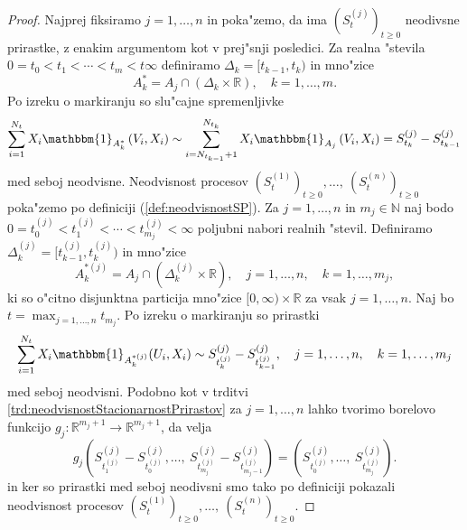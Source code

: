 \documentclass[12pt, a4paper, reqno]{amsart}
\theoremstyle{definition}
\theoremstyle{plain}
\newcommand{\R}{\mathbb{R}}
\newcommand{\N}{\mathbb{N}}
\newcommand{\1}{\mathds{1}}
\begin{document}
        \begin{proof}
            Najprej fiksiramo $j=1, \dots, n$ in poka"zemo, da ima $(S_t^{(j)})_{t\geq0}$   neodivsne prirastke, z 
            enakim argumentom kot v prej"snji posledici. 
            Za realna "stevila $0 = t_0 < t_1 < \cdots < t_m < t \infty$ definiramo $\Delta_k = [t_{k-1}, t_k)$ in 
            mno"zice 
            \begin{equation*}
                A_k^* = A_j \cap \left(\Delta_k \times \R\right), \quad k = 1, \dots, m.
            \end{equation*}
            Po izreku o markiranju so slu"cajne spremenljivke 
            \begin{equation*}
                \sum_{i = 1}^{N_{t}}X_i\mathbbm{1}_{A_k^*}\left(V_i, X_i\right) \sim \sum_{i = N_{t_{k-1}}+1}^{N_{t_k}}X_i\mathbbm{1}_{A_j}\left(V_i, X_i\right) = S_{t_k}^{(j)} - S_{t_{k-1}}^{(j)}
            \end{equation*}
            med seboj neodvisne.
            Neodvisnost procesov $(S_t^{(1)})_{t\geq0}, \dots, \ (S_t^{(n)})_{t\geq0}$ poka"zemo po definiciji
            (\ref{def:neodvisnostSP}). Za $j=1, \dots, n$ in $m_j\in\N$ naj bodo $0 = t_0^{(j)} < t_1^{(j)} < \cdots < t^{(j)}_{m_j} < \infty$ 
            poljubni nabori realnih "stevil. Definiramo $\Delta^{(j)}_k = [t^{(j)}_{k-1}, t^{(j)}_k)$ in mno"zice
            \begin{equation*}
                A_k^{*(j)} = A_j \cap \left(\Delta_k^{(j)} \times \R\right), \quad j = 1, \dots, n, \quad k = 1, \dots, m_j,
            \end{equation*}
            ki so o"citno disjunktna particija mno"zice $[0, \infty)\times \R$ za vsak
            $j = 1, \dots, n$. Naj bo $t = \max_{j = 1, \dots, n}t_{m_j}$. Po izreku o markiranju 
            so prirastki
            \begin{equation*}
                \sum_{i = 1}^{N_t} X_i\mathbbm{1}_{A_k^{*(j)}}(U_i, X_i) \sim 
                S_{t_k^{(j)}}^{(j)} - S_{t_{k-1}^{(j)}}^{(j)}, \quad j = 1, \dots, n, \quad k = 1, \dots, m_j
            \end{equation*}
            med seboj neodvisni. Podobno kot v trditvi \ref{trd:neodvisnostStacionarnostPrirastov} za 
            $j=1, \dots, n$ lahko tvorimo 
            borelovo funkcijo $g_j:\R^{m_j + 1}\to\R^{m_j + 1}$, da velja 
            \begin{equation*}
                g_j\left(S_{t_1^{(j)}}^{(j)} - S_{t_0^{(j)}}^{(j)}, \dots, \ S_{t_{m_j}^{(j)}}^{(j)} - S_{t_{m_j - 1}^{(j)}}^{(j)}\right) = 
                \left(S_{t_0^{(j)}}^{(j)}, \dots, \ S_{t_{m_j}^{(j)}}^{(j)}\right).
            \end{equation*}
            in ker so prirastki med seboj neodivsni smo tako 
            po definiciji pokazali neodvisnost 
            procesov $(S_t^{(1)})_{t\geq0}, \dots, \ (S_t^{(n)})_{t\geq0}$.
            

        \end{proof}
\end{document}
